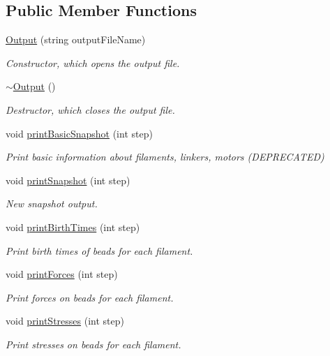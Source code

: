 \subsection*{Public Member Functions}
\begin{DoxyCompactItemize}
\item 
\hyperlink{classOutput_a75c8133d932621debacb30634ef5258c}{Output} (string output\+File\+Name)
\begin{DoxyCompactList}\small\item\em Constructor, which opens the output file. \end{DoxyCompactList}\item 
\hyperlink{classOutput_a61d0840daf98bea49e4dc471f235eeab}{$\sim$\+Output} ()
\begin{DoxyCompactList}\small\item\em Destructor, which closes the output file. \end{DoxyCompactList}\item 
void \hyperlink{classOutput_ad35067cbcca30c5cea00735d1d11f2b5}{print\+Basic\+Snapshot} (int step)
\begin{DoxyCompactList}\small\item\em Print basic information about filaments, linkers, motors (D\+E\+P\+R\+E\+C\+A\+T\+E\+D) \end{DoxyCompactList}\item 
void \hyperlink{classOutput_a786eca35e9c06d89eab804c67b314e61}{print\+Snapshot} (int step)
\begin{DoxyCompactList}\small\item\em New snapshot output. \end{DoxyCompactList}\item 
void \hyperlink{classOutput_a1ca68aeb9bbffdcdc2a1d473ed923ceb}{print\+Birth\+Times} (int step)
\begin{DoxyCompactList}\small\item\em Print birth times of beads for each filament. \end{DoxyCompactList}\item 
void \hyperlink{classOutput_a86a58b2b083f2a6043ad30b8c3d14ba0}{print\+Forces} (int step)
\begin{DoxyCompactList}\small\item\em Print forces on beads for each filament. \end{DoxyCompactList}\item 
void \hyperlink{classOutput_acb72afbff4487898488cdfd6a829ce45}{print\+Stresses} (int step)
\begin{DoxyCompactList}\small\item\em Print stresses on beads for each filament. \end{DoxyCompactList}\end{DoxyCompactItemize}
